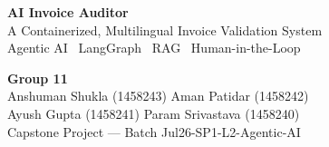 \documentclass[aspectratio=169]{beamer}
\begin{document}
{
\begin{frame}[plain]

  \vspace{0.9cm}
  \begin{center}
    {\color{white}\Huge\bfseries AI Invoice Auditor}\\[6pt]
    {\color{white!85}\Large A Containerized, Multilingual Invoice Validation System}\\[12pt]
    {\color{white!70}\normalsize
      Agentic AI \textbullet\ LangGraph \textbullet\ RAG \textbullet\ Human-in-the-Loop}\\[18pt]

      \vspace{0.8cm}
  \end{center}

  \vfill
  \begin{center}
    {\color{white}\footnotesize\bfseries Group 11}\\[3pt]
    {\color{white!90}\footnotesize
      Anshuman Shukla (1458243) \quad Aman Patidar (1458242)}\\[2pt]
    {\color{white!90}\footnotesize
      Ayush Gupta (1458241) \quad Param Srivastava (1458240)}\\[8pt]
    {\color{white}\scriptsize Capstone Project — Batch Jul26-SP1-L2-Agentic-AI}
  \end{center}
  \vspace{0.5cm}
\end{frame}
}
\end{document}
